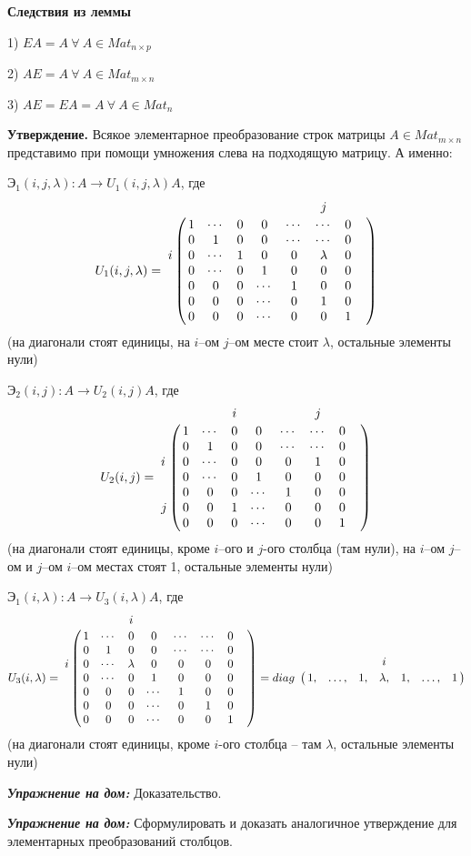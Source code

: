 \vspace{\baselineskip}
\textbf{Следствия из леммы}

1) $EA = A \ \forall \ A \in Mat_{n \times p}$

2) $AE = A \ \forall \ A \in Mat_{m \times n}$

3) $AE = EA = A \ \forall \ A \in Mat_n$

\vspace{\baselineskip}
\textbf{Утверждение.} Всякое элементарное преобразование строк матрицы $A \in Mat_{m \times n}$ представимо при помощи умножения слева на подходящую матрицу. А именно:

$Э_1(i, j, \lambda): A \rightarrow U_1(i, j, \lambda) A$, где
\begin{equation*} U_1(i, j, \lambda) = \bordermatrix{ 
    	 & & & & & & j & &  \cr
    	 & 1 & \cdots & 0 & 0 & \cdots & \cdots & 0 \cr 
          & 0 & 1 & 0 & 0 & \cdots & \cdots & 0 \cr
		i & 0 & \cdots & 1 & 0 & 0 & \lambda & 0  \cr
         & 0 & \cdots & 0 & 1 & 0 & 0 & 0  \cr
        & 0 & 0 & 0 & \cdots & 1 & 0 & 0  \cr
        & 0 & 0 & 0 & \cdots & 0 & 1 & 0  \cr
        & 0 & 0 & 0 & \cdots & 0 & 0 & 1 }
\end{equation*}
(на диагонали стоят единицы, на $i$--ом $j$--ом месте стоит $\lambda$, остальные элементы нули)

\vspace{\baselineskip}
$Э_2(i, j): A \rightarrow U_2(i, j) A$, где
\begin{equation*} U_2(i, j) = \bordermatrix{ 
    	 & & & i & & & j & &  \cr
    	 & 1 & \cdots & 0 & 0 & \cdots & \cdots & 0 \cr 
          & 0 & 1 & 0 & 0 & \cdots & \cdots & 0 \cr
		i & 0 & \cdots & 0 & 0 & 0 & 1 & 0  \cr
         & 0 & \cdots & 0 & 1 & 0 & 0 & 0  \cr
        & 0 & 0 & 0 & \cdots & 1 & 0 & 0  \cr
        j & 0 & 0 & 1 & \cdots & 0 & 0 & 0  \cr
        & 0 & 0 & 0 & \cdots & 0 & 0 & 1 }
\end{equation*}
(на диагонали стоят единицы, кроме $i$--ого и $j$-ого столбца (там нули), на $i$--ом $j$--ом и $j$--ом $i$--ом местах стоят 1, остальные элементы нули)

\vspace{\baselineskip}
$Э_1(i, \lambda): A \rightarrow U_3(i, \lambda) A$, где
\begin{equation*} U_3(i,\lambda) = \bordermatrix{ 
    	 & & & i & & & & &  \cr
    	 & 1 & \cdots & 0 & 0 & \cdots & \cdots & 0 \cr 
          & 0 & 1 & 0 & 0 & \cdots & \cdots & 0 \cr
		i & 0 & \cdots & \lambda & 0 & 0 & 0 & 0  \cr
         & 0 & \cdots & 0 & 1 & 0 & 0 & 0  \cr
        & 0 & 0 & 0 & \cdots & 1 & 0 & 0  \cr
        & 0 & 0 & 0 & \cdots & 0 & 1 & 0  \cr
        & 0 & 0 & 0 & \cdots & 0 & 0 & 1 } = diag 
        \bordermatrix{
        & & & & i & & \cr
        & 1, & \dots, & 1, & \lambda, & 1, & \dots, & 1}
\end{equation*}
(на диагонали стоят единицы, кроме $i$-ого столбца -- там $\lambda$, остальные элементы нули)

\vspace{\baselineskip}
\textbf{\textit{Упражнение на дом:}} Доказательство.

\textbf{\textit{Упражнение на дом:}} Сформулировать и доказать аналогичное утверждение для элементарных преобразований столбцов.

